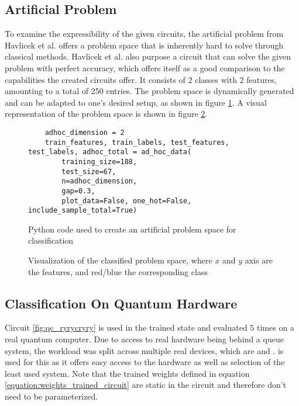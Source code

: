 \subsection{Artificial Problem}
\label{chapter:artificial_problem}

To examine the expressibility of the given circuits, the artificial problem from Havlicek et al. \cite{havlicek_supervised_2019} offers a problem space that is inherently hard to solve through classical methods. Havlicek et al. also purpose a circuit that can solve the given problem with perfect accuracy, which offers itself as a good comparison to the capabilities the created circuits offer. It consists of $2$ classes with $2$ features, amounting to a total of 250 entries. The problem space is dynamically generated and can be adapted to one's desired setup, as shown in figure \ref{fig:ad_hoc_code}. A visual representation of the problem space is shown in figure \ref{fig:problem_space_plot}.

\begin{figure}[!ht]
    \centering
    \begin{verbatim}
    adhoc_dimension = 2
    train_features, train_labels, test_features, test_labels, adhoc_total = ad_hoc_data(
        training_size=188,
        test_size=67,
        n=adhoc_dimension,
        gap=0.3,
        plot_data=False, one_hot=False, include_sample_total=True)
    \end{verbatim}
    \caption{Python code used to create an artificial problem space for classification}
    \label{fig:ad_hoc_code}
\end{figure}

\begin{figure}
    \centering
    \scalebox{0.75}{
        
    }
    \caption{Visualization of the classified problem space, where $x$ and $y$ axis are the features, and red/blue the corresponding class}
    \label{fig:problem_space_plot}
\end{figure}

\clearpage
\subsection{Classification On Quantum Hardware}
Circuit \ref{fig:qc_ryrycryry} is used in the trained state and evaluated $5$ times on a real quantum computer. Due to access to real hardware being behind a queue system, the workload was split across multiple real devices, which are  and .  is used for this as it offers easy access to the hardware as well as selection of the least used system. Note that the trained weights defined in equation \ref{equation:weights_trained_circuit} are static in the circuit and therefore don't need to be parameterized.


